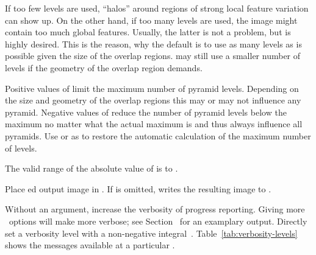 \begin{codelist}
\begin{geeknote}
    If too few levels are used, ``halos'' around regions of strong
    local feature variation can show up.  On the other hand, if too
    many levels are used, the image might contain too much global
    features.  Usually, the latter is not a problem, but is highly
    desired.  This is the reason, why the default is to use as many
    levels as is possible given the size of the overlap regions.
    \App{} may still use a smaller number of levels if the geometry of
    the overlap region demands.
  \end{geeknote}

  Positive values of  limit the maximum number of
  pyramid levels.  Depending on the size and geometry of the overlap
  regions this may or may not influence any pyramid.  Negative values
  of  reduce the number of pyramid levels below the
  maximum no matter what the actual maximum is and thus always
  influence all pyramids.  Use  or  as
   to restore the automatic calculation of the maximum
  number of levels.

  The valid range of the absolute value of  is
   to
  .

  \label{opt:output}%
\item[\itempar{-o \metavar{FILE} \\ --output=\metavar{FILE}}]\itemend
  Place \appdoes{}ed output image in .  If
   is omitted, \App{} writes the resulting image to
  .%


  \label{opt:verbose}%
\item[\itempar{-v \optional{\metavar{LEVEL}} \\ --verbose\optional{=\metavar{LEVEL}}}]\itemend
  Without an argument, increase the verbosity of progress reporting.
  Giving more ~options will make \App{} more
  verbose; see Section~ for an
  examplary output.  Directly set a verbosity level with a
  non-negative integral~.
  Table~\ref{tab:verbosity-levels} shows the messages available at a
  particular .


\end{codelist}
